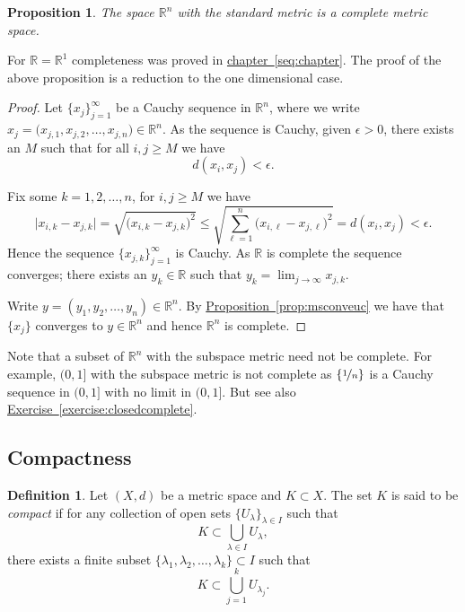 \documentclass[12pt]{book}
\newcommand{\R}{{\mathbb{R}}}
\newcommand{\myindex}[1]{#1\index{#1}}
\theoremstyle{plain}
\newtheorem{prop}[thm]{Proposition}
\theoremstyle{remark}
\theoremstyle{definition}
\newtheorem{defn}[thm]{Definition}
\theoremstyle{exercise}
\theoremstyle{example}
\newcommand{\chapterref}[1]{\hyperref[#1]{chapter~\ref*{#1}}}
\newcommand{\exerciseref}[1]{\hyperref[#1]{Exercise~\ref*{#1}}}
\newcommand{\propref}[1]{\hyperref[#1]{Proposition~\ref*{#1}}}
\begin{document}
\begin{prop}
The space $\R^n$ with the standard metric is a complete metric space.
\end{prop}

For $\R = \R^1$ completeness was proved in \chapterref{seq:chapter}.  The proof of
the above proposition is a reduction to the one dimensional case.

\begin{proof}
Let $\{ x_j \}_{j=1}^\infty$ be a Cauchy sequence
in $\R^n$, where we write $x_j = \bigl(x_{j,1},x_{j,2},\ldots,x_{j,n}\bigr) \in \R^n$.
As the sequence is Cauchy, given $\epsilon > 0$, there exists an $M$ such that for all
$i,j \geq M$ we have
\begin{equation*}
d(x_i,x_j) < \epsilon.
\end{equation*}

Fix some $k=1,2,\ldots,n$, for $i,j \geq M$ we have
\begin{equation*}
\bigl\lvert x_{i,k} - x_{j,k} \bigr\rvert
=
\sqrt{{\bigl(x_{i,k} - x_{j,k}\bigr)}^2}
\leq
\sqrt{\sum_{\ell=1}^n {\bigl(x_{i,\ell}-x_{j,\ell}\bigr)}^2}
= d(x_i,x_j) < \epsilon .
\end{equation*}
Hence the sequence $\{ x_{j,k} \}_{j=1}^\infty$ is Cauchy.  As $\R$ is
complete the sequence converges; there exists an $y_k \in \R$ such that
$y_k = \lim_{j\to\infty} x_{j,k}$.

Write $y = (y_1,y_2,\ldots,y_n) \in \R^n$.
By \propref{prop:msconveuc} we have that $\{ x_j \}$ converges
to $y \in \R^n$ and hence $\R^n$ is complete.
\end{proof}

Note that a subset of $\R^n$ with the subspace metric need not be
complete.  For example, $(0,1]$ with the subspace metric is not
complete as $\{ \nicefrac{1}{n} \}$ is a Cauchy sequence in $(0,1]$
with no limit in $(0,1]$.  But see also
\exerciseref{exercise:closedcomplete}.

\subsection{Compactness}

\begin{defn}
Let $(X,d)$ be a metric space and $K \subset X$. 
The set $K$ is said to be \emph{\myindex{compact}}
if for any collection
of open sets $\{ U_{\lambda} \}_{\lambda \in I}$ such that
\begin{equation*}
K \subset \bigcup_{\lambda \in I} U_\lambda ,
\end{equation*}
there exists a finite subset
$\{ \lambda_1, \lambda_2,\ldots,\lambda_k \} \subset I$
such that
\begin{equation*}
K \subset \bigcup_{j=1}^k U_{\lambda_j} .
\end{equation*}
\end{defn}
\end{document}
